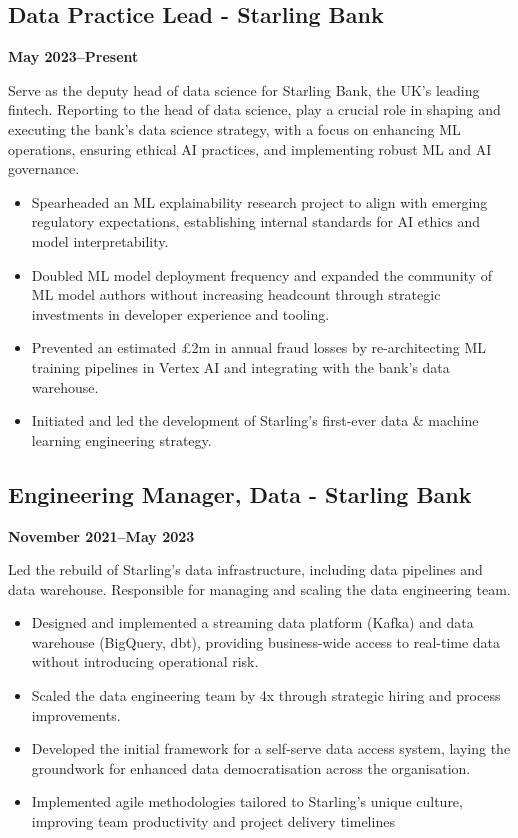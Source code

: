\documentclass[a4paper]{scrartcl}
\begin{document}
\subsection*{Data Practice Lead - Starling Bank}
\textbf{May 2023--Present}

Serve as the deputy head of data science for Starling Bank, the UK's leading fintech. Reporting to the head of data science, play a crucial role in shaping and executing the bank's data science strategy, with a focus on enhancing ML operations, ensuring ethical AI practices, and implementing robust ML and AI governance.
\begin{itemize}
	\item Spearheaded an ML explainability research project to align with emerging regulatory expectations, establishing internal standards for AI ethics and model interpretability.
	\item Doubled ML model deployment frequency and expanded the community of ML model authors without increasing headcount through strategic investments in developer experience and tooling.
	\item Prevented an estimated £2m in annual fraud losses by re-architecting ML training pipelines in Vertex AI and integrating with the bank's data warehouse.
	\item Initiated and led the development of Starling's first-ever data \& machine learning engineering strategy.
\end{itemize}

\subsection*{Engineering Manager, Data - Starling Bank}
\textbf{November 2021--May 2023}

Led the rebuild of Starling's data infrastructure, including data pipelines and data warehouse. Responsible for managing and scaling the data engineering team.
\begin{itemize}
	\item Designed and implemented a streaming data platform (Kafka) and data warehouse (BigQuery, dbt), providing business-wide access to real-time data without introducing operational risk.
	\item Scaled the data engineering team by 4x through strategic hiring and process improvements.
	\item Developed the initial framework for a self-serve data access system, laying the groundwork for enhanced data democratisation across the organisation.
	\item Implemented agile methodologies tailored to Starling's unique culture, improving team productivity and project delivery timelines
\end{itemize}
\end{document}
